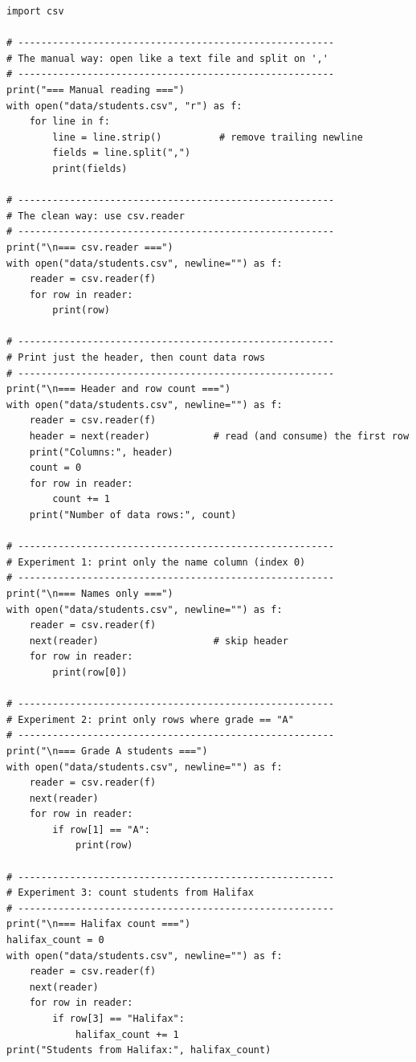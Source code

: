 \documentclass{cslab}
\begin{document}
\begin{lstlisting}
import csv

# -------------------------------------------------------
# The manual way: open like a text file and split on ','
# -------------------------------------------------------
print("=== Manual reading ===")
with open("data/students.csv", "r") as f:
    for line in f:
        line = line.strip()          # remove trailing newline
        fields = line.split(",")
        print(fields)

# -------------------------------------------------------
# The clean way: use csv.reader
# -------------------------------------------------------
print("\n=== csv.reader ===")
with open("data/students.csv", newline="") as f:
    reader = csv.reader(f)
    for row in reader:
        print(row)

# -------------------------------------------------------
# Print just the header, then count data rows
# -------------------------------------------------------
print("\n=== Header and row count ===")
with open("data/students.csv", newline="") as f:
    reader = csv.reader(f)
    header = next(reader)           # read (and consume) the first row
    print("Columns:", header)
    count = 0
    for row in reader:
        count += 1
    print("Number of data rows:", count)

# -------------------------------------------------------
# Experiment 1: print only the name column (index 0)
# -------------------------------------------------------
print("\n=== Names only ===")
with open("data/students.csv", newline="") as f:
    reader = csv.reader(f)
    next(reader)                    # skip header
    for row in reader:
        print(row[0])

# -------------------------------------------------------
# Experiment 2: print only rows where grade == "A"
# -------------------------------------------------------
print("\n=== Grade A students ===")
with open("data/students.csv", newline="") as f:
    reader = csv.reader(f)
    next(reader)
    for row in reader:
        if row[1] == "A":
            print(row)

# -------------------------------------------------------
# Experiment 3: count students from Halifax
# -------------------------------------------------------
print("\n=== Halifax count ===")
halifax_count = 0
with open("data/students.csv", newline="") as f:
    reader = csv.reader(f)
    next(reader)
    for row in reader:
        if row[3] == "Halifax":
            halifax_count += 1
print("Students from Halifax:", halifax_count)
\end{lstlisting}
\end{document}
